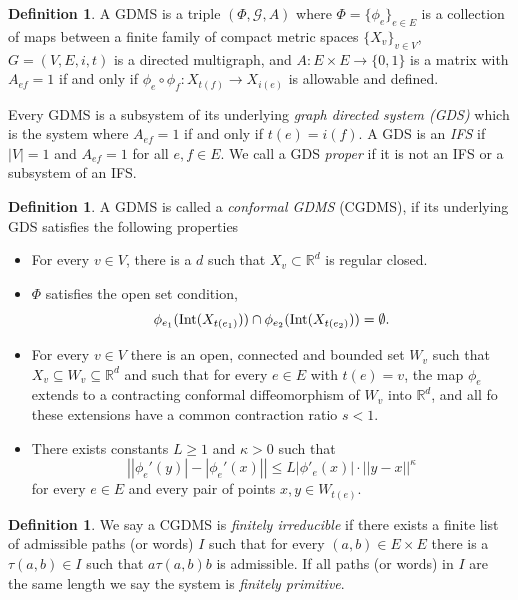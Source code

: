 \documentclass[11pt]{amsart}
\theoremstyle{plain}
\theoremstyle{definition}
\newtheorem{definition}[theorem]{Definition}
\renewcommand\~{\tilde}%
\newcommand{\cG}{\ensuremath{\mathcal{G}}}
\newcommand{\RR}{\ensuremath{\mathbb R}}%
\numberwithin{equation}{section}
\begin{document}
\begin{definition} 
    A GDMS is a triple $(\Phi, \cG,A)$ where $\Phi = \{\phi_e\}_{e\in E}$ is a collection of maps between a finite family of compact metric spaces $\{X_v\}_{v\in V}$, $G = (V,E,i,t)$ is a directed multigraph, and $A:E\times E\to \{0,1\}$ is a matrix with $A_{ef} = 1$ if and only if $\phi_e\circ\phi_f:X_{t(f)}\to X_{i(e)}$ is allowable and defined.  
\end{definition}

Every GDMS is a subsystem of its underlying {\it graph directed system (GDS)} which is the system where $A_{ef}=1$ if and only if $t(e)=i(f)$. A GDS is an {\it IFS} if $|V|=1$ and $A_{ef} = 1$ for all $e,f\in E$. We call a GDS \textit{proper} if it is not an IFS or a subsystem of an IFS.

\begin{definition}\label{def:con}
 A GDMS is called a {\it conformal GDMS} (CGDMS), if its underlying GDS satisfies the following properties
 \begin{itemize}
    \item[1.] For every $v\in V$, there is a $d$ such that $X_v\subset \RR^d$ is regular closed.\\
    \item[2.] $\Phi$ satisfies the open set condition,
    $$
        \phi_{e_1}({\rm Int}(X_{t(e_1)}))\cap\phi_{e_2}({\rm Int}(X_{t(e_2)})) = \emptyset.
    $$
    \item[3.] For every $v\in V$ there is an open, connected and bounded set $W_v$ such that $X_v\subseteq W_v\subseteq \RR^d$ and such that for every $e\in E$ with $t(e) = v$, the map $\phi_e$ extends to a contracting conformal diffeomorphism of $W_v$ into $\RR^d$, and all fo these extensions have a common contraction ratio $s<1$. 
    \item[4.] There exists constants $L\geq 1$ and $\kappa>0$ such that 
    $$
        \left\vert|\phi_e'(y)|-|\phi_e'(x)|\right|\leq L|\phi'_e(x)|\cdot ||y-x||^{\kappa}
    $$
    for every $e\in E$ and every pair of points $x,y\in W_{t(e)}$.
 \end{itemize}
\end{definition}

\begin{definition} 
    We say a CGDMS is \textit{finitely irreducible} if there exists a finite list of admissible paths (or words) $I$ such that for every $(a,b)\in E\times E$ there is a $\tau(a,b)\in I$ such that $a\tau(a,b)b$ is admissible. If all paths (or words) in $I$ are the same length we say the system is \textit{finitely primitive}.
\end{definition}
\end{document}
